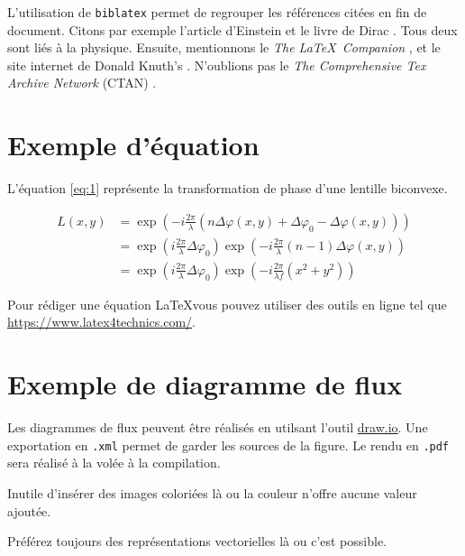 \documentclass{heig-tb}
\begin{document}
L'utilisation de \texttt{biblatex} permet de regrouper les références citées en fin de document. Citons par exemple l'article d'Einstein
\cite{einstein} et le livre de Dirac \cite{dirac}. Tous deux sont liés à la physique. Ensuite, mentionnons le \textit{The \LaTeX\ Companion}
 \cite{latexcompanion}, et le site internet de Donald Knuth's \cite{knuthwebsite}. N'oublions pas le
\textit{The Comprehensive Tex Archive Network} (CTAN)
\cite{ctan}.

\section{Exemple d'équation}
L'équation \ref{eq:1} représente la transformation de phase d'une lentille biconvexe.

\begin{equation} \label{eq:1}
\begin{split}
L(x,y) &= \exp\left( - i\frac{{2\pi }}{\lambda }\left( {n\Delta \varphi (x,y) + \Delta {\varphi _0} - \Delta \varphi (x,y)} \right)\right)\\
 &= \exp\left({{i\frac{{2\pi }}{\lambda }\Delta {\varphi _0}}}\right)\exp\left({{ - i\frac{{2\pi }}{\lambda }(n - 1)\Delta \varphi (x,y)}}\right)\\
 &= {\exp\left({i\frac{{2\pi }}{\lambda }\Delta {\varphi _0}}\right)}{\exp\left({ - i\frac{{2\pi }}{{\lambda f}}({x^2} + {y^2})}\right)}
\end{split}
\end{equation}

Pour rédiger une équation \LaTeX vous pouvez utiliser des outils en ligne tel que \url{https://www.latex4technics.com/}.

\clearpage
\section{Exemple de diagramme de flux}

Les diagrammes de flux peuvent être réalisés en utilsant l'outil \url{draw.io}. Une exportation en \texttt{.xml} permet de garder les sources de la figure. Le rendu en \texttt{.pdf} sera réalisé à la volée à la compilation.


Inutile d'insérer des images coloriées là ou la couleur n'offre aucune valeur ajoutée.

Préférez toujours des représentations vectorielles là ou c'est possible.

\clearpage
\end{document}
